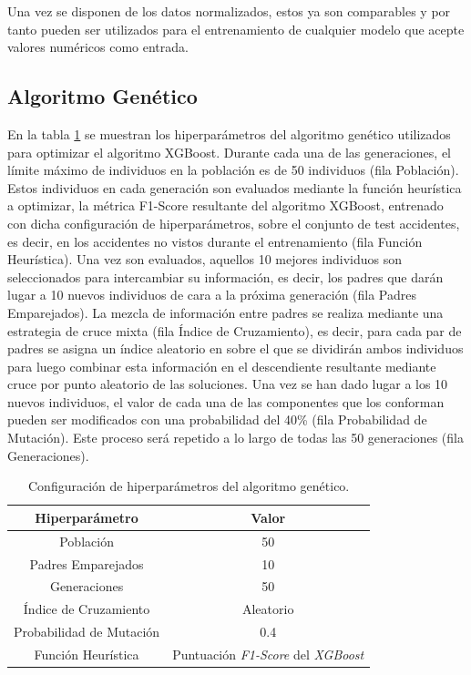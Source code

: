\documentclass{uathesis-es}
\begin{document}
{Una vez se disponen de los datos normalizados, estos ya son comparables y por tanto pueden ser utilizados para el entrenamiento de cualquier modelo que acepte valores numéricos como entrada.


\subsection{Algoritmo Genético}


En la tabla \ref{GAHyperparametersSetup} se muestran los hiperparámetros del algoritmo genético utilizados para optimizar el algoritmo XGBoost. Durante cada una de las generaciones, el límite máximo de individuos en la población es de 50 individuos (fila Población). Estos individuos en cada generación son evaluados mediante la función heurística a optimizar, la métrica F1-Score resultante del algoritmo XGBoost, entrenado con dicha configuración de hiperparámetros, sobre el conjunto de test accidentes, es decir, en los accidentes no vistos durante el entrenamiento (fila Función Heurística). Una vez son evaluados, aquellos 10 mejores individuos son seleccionados para intercambiar su información, es decir, los padres que darán lugar a 10 nuevos individuos de cara a la próxima generación (fila Padres Emparejados). La mezcla de información entre padres se realiza mediante una estrategia de cruce mixta (fila Índice de Cruzamiento), es decir, para cada par de padres se asigna un índice aleatorio en sobre el que se dividirán ambos individuos para luego combinar esta información en el descendiente resultante mediante cruce por punto aleatorio de las soluciones. Una vez se han dado lugar a los 10 nuevos individuos, el valor de cada una de las componentes que los conforman pueden ser modificados con una probabilidad del 40\% (fila Probabilidad de Mutación). Este proceso será repetido a lo largo de todas las 50 generaciones (fila Generaciones).


\begin{table}[H]
    \centering
    \begin{tabular}{|c|c|}
        \hline
            \textbf{Hiperparámetro} & \textbf{Valor} \\ \hline
            \hline
            Población     & 50 \\ \hline
            Padres Emparejados & 10 \\ \hline
            Generaciones    & 50 \\ \hline
            Índice de Cruzamiento & Aleatorio \\ \hline
            Probabilidad de Mutación & 0.4 \\ \hline
            Función Heurística & Puntuación \textit{F1-Score} del \textit{XGBoost} \\ \hline \hline
    \end{tabular}
    \caption{Configuración de hiperparámetros del algoritmo genético.}
    \label{GAHyperparametersSetup}
\end{table}

}
\end{document}
